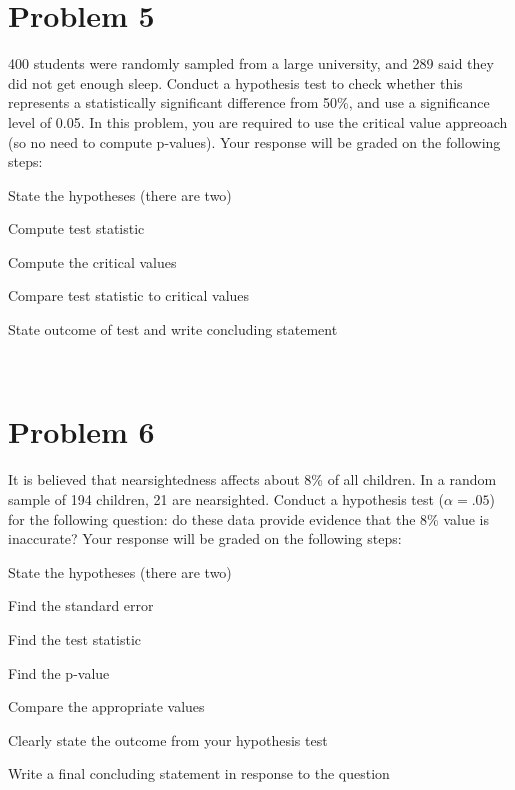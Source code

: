 \documentclass[11pt,twoside]{article}
\newcommand{\pts}[1]{\marginpar{ \small\hspace{0pt} \textit{[#1]} } }
\newcommand{\?}{\stackrel{?}{=}}
\begin{document}
 \section*{Problem 5       }
 400 students were randomly sampled from a large university, and 289 said they did not get enough sleep. Conduct a hypothesis test to check whether this represents a statistically significant difference from 50\%, and use a significance level of 0.05.
 In this problem, you are required to use the critical value appreoach (so no need to compute p-values). Your response will be graded on the following steps:
 \begin{compactitem}
  \item State the hypotheses (there are two) \pts{2}
  \item Compute test statistic \pts{2}
  \item Compute the critical values \pts{2}
  \item Compare test statistic to critical values \pts{2}
  \item State outcome of test and write concluding statement \pts{2}
 \end{compactitem}


 \eject 
 ~
 \eject

 \section*{Problem 6       }
 It is believed that nearsightedness affects about 8\% of all children. In a random sample of 194 children, 21 are nearsighted. Conduct a hypothesis test ($\alpha=.05$) for the following question: do these data provide evidence that the 8\% value is inaccurate?
 Your response will be graded on the following steps:
 \begin{compactitem}
   \item State the hypotheses (there are two) \pts{2}
   \item Find the standard error \pts{2}
   \item Find the test statistic \pts{2}
   \item Find the p-value \pts{2}
   \item Compare the appropriate values \pts{1}
   \item Clearly state the outcome from your hypothesis test \pts{1}
   \item Write a final concluding statement in response to the question \pts{2}
   \end{compactitem}
\end{document}
